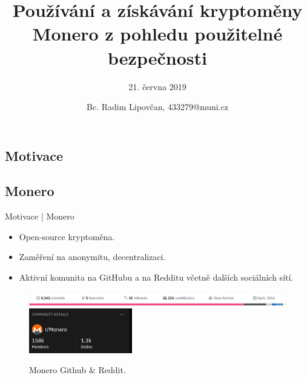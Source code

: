 \documentclass{beamer}
\title{Používání a získávání kryptoměny Monero z pohledu použitelné bezpečnosti} %
\subtitle{21. června 2019} %
\author{Bc. Radim Lipovčan, 433279@muni.cz}
\begin{document}
  \frame{\maketitle}


  \begin{darkframes}
   \section{Motivace}

    \subsection{Monero}
    \begin{frame}{Motivace | Monero}
		\begin{itemize}
		\item Open-source kryptoměna.
    	\item Zaměření na anonymitu, decentralizaci.
     	\item Aktivní komunita na GitHubu a na Redditu včetně dalších sociálních sítí.
		\end{itemize}  
		\begin{figure}
  \centering
  \includegraphics[width=1\textwidth]{monero-github.png}
  \includegraphics[width=0.4\textwidth]{monero-reddit.png}
  \caption{Monero Github \& Reddit.}  \label{fig:xray}
\end{figure}
		  

\end{frame}
\end{darkframes}
\end{document}
